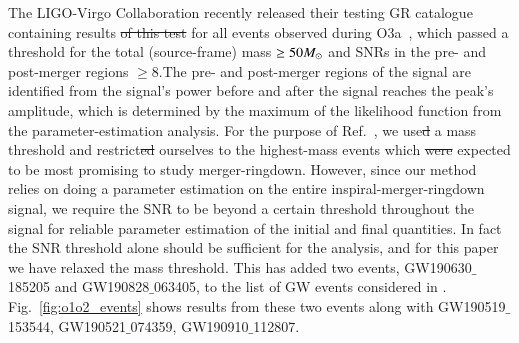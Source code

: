
The LIGO-Virgo Collaboration recently released their testing GR
catalogue containing results \sout{of this test} for all events observed
during O3a~\cite{Abbott:2020jks}, which passed a threshold for the
total (source-frame) mass $\geq 50 M_{\odot}$ and SNRs in the pre- and
post-merger regions $\geq 8$.The pre- and post-merger regions of the
signal are identified from the signal's power before and after the signal reaches the peak's
amplitude, which is determined by the maximum of the
likelihood function from the parameter-estimation analysis.
For the purpose of Ref.~\cite{Abbott:2020jks}, we use\sout{d} a mass
threshold and restrict\sout{ed} ourselves to the highest-mass events which
\sout{were}  expected to be most promising to study merger-ringdown. However,
since our method relies on doing a parameter estimation on the entire
inspiral-merger-ringdown signal, we require the SNR to be beyond a
certain threshold throughout the signal for reliable parameter
estimation of the initial and final quantities.  In fact the SNR
threshold alone should be sufficient for the analysis, and for this
paper we have relaxed the mass threshold. This has added two events,
GW190630$\_$185205 and GW190828$\_$063405, to the list of GW events
considered in \cite{Abbott:2020jks}. Fig.~\ref{fig:o1o2_events} shows results from these two
events along with GW190519$\_$153544, GW190521$\_$074359,
GW190910$\_$112807. 

